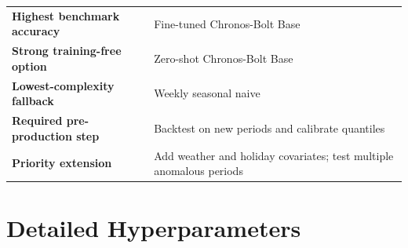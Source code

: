 \documentclass[11pt,a4paper]{article}
\begin{document}
\begin{finding}
\begin{tabularx}{\textwidth}{@{}lY@{}}
\textbf{Highest benchmark accuracy} & Fine-tuned Chronos-Bolt Base\\
\textbf{Strong training-free option} & Zero-shot Chronos-Bolt Base\\
\textbf{Lowest-complexity fallback} & Weekly seasonal naive\\
\textbf{Required pre-production step} & Backtest on new periods and calibrate quantiles\\
\textbf{Priority extension} & Add weather and holiday covariates; test multiple anomalous periods\\
\end{tabularx}
\end{finding}

\appendix
\section{Detailed Hyperparameters}
\end{document}
